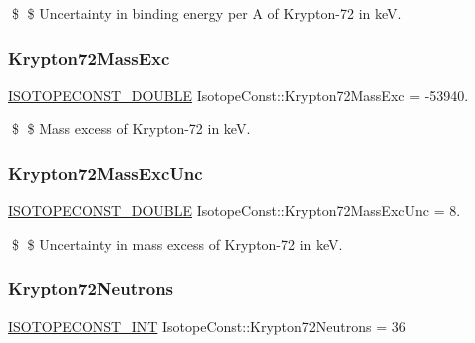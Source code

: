\$ \$ Uncertainty in binding energy per A of Krypton-\/72 in keV. \mbox{\label{group___isotope_const-_krypton-_kr72_ga66056275d274548c8e83d23f778536cf}} 
\subsubsection{\texorpdfstring{Krypton72\+Mass\+Exc}{Krypton72MassExc}}
{\footnotesize\ttfamily \mbox{\hyperlink{group___isotope_const-_macros_ga8f45a7272ce02c0b4c65c44636ed719a}{I\+S\+O\+T\+O\+P\+E\+C\+O\+N\+S\+T\+\_\+\+D\+O\+U\+B\+LE}} Isotope\+Const\+::\+Krypton72\+Mass\+Exc = -\/53940.}

\$ \$ Mass excess of Krypton-\/72 in keV. \mbox{\label{group___isotope_const-_krypton-_kr72_ga3a24579e3282be5e06754554dd05251b}} 
\subsubsection{\texorpdfstring{Krypton72\+Mass\+Exc\+Unc}{Krypton72MassExcUnc}}
{\footnotesize\ttfamily \mbox{\hyperlink{group___isotope_const-_macros_ga8f45a7272ce02c0b4c65c44636ed719a}{I\+S\+O\+T\+O\+P\+E\+C\+O\+N\+S\+T\+\_\+\+D\+O\+U\+B\+LE}} Isotope\+Const\+::\+Krypton72\+Mass\+Exc\+Unc = 8.}

\$ \$ Uncertainty in mass excess of Krypton-\/72 in keV. \mbox{\label{group___isotope_const-_krypton-_kr72_ga549fde19ff80267cdc70b2db057a00fc}} 
\subsubsection{\texorpdfstring{Krypton72\+Neutrons}{Krypton72Neutrons}}
{\footnotesize\ttfamily \mbox{\hyperlink{group___isotope_const-_macros_ga5f18360b3e99483a35c32d789e62621c}{I\+S\+O\+T\+O\+P\+E\+C\+O\+N\+S\+T\+\_\+\+I\+NT}} Isotope\+Const\+::\+Krypton72\+Neutrons = 36}

